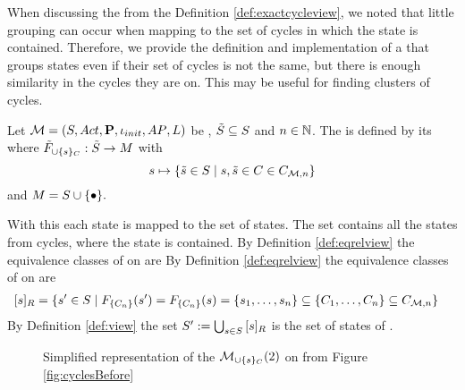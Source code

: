 \documentclass[preview]{standalone}
\begin{document}
When discussing the \viewN \viewexactcycle from the Definition \ref{def:exactcycleview}, we noted that little grouping can occur when mapping to the set of cycles in which the state is contained. Therefore, we provide the definition and implementation of a \viewN that groups states even if their set of cycles is not the same, but there is enough similarity in the cycles they are on. This may be useful for finding clusters of cycles.

\begin{definition}
	Let ${{{\mathcal{M}}}} = {{({S}, {Act}, {\textbf{P}}, {\iota_{init}}, {AP}, {L})}}$ be \achgphN, ${\tilde{{S}}} \subseteq {S}$ and $n \in {\mathbb{N}}$. The \viewN \viewcycleset is defined by its \grpfctN \gfctcycleset where $\gfctsubcycleset : \smstates \to \imggrp$ with
	\[
	\state \mapsto \{\smstate \in \states \mid \state, \smstate \in \cycle \in \cycleset\}
	\]
	and $\imggrp = \states \cup \remset.$
\end{definition}
With this \viewN each state \state is mapped to the set of states. The set contains all the states from cycles, where the state \state is contained. By Definition \ref{def:eqrelview} the equivalence classes of \eqrelview on \states are By Definition \ref{def:eqrelview} the equivalence classes of \eqrelview on \states are
\begin{align*}
	\eqclassv &= \{\state' \in \states \mid \gfctexactcycle(\state') = \gfctexactcycle(\state) = \{\state_1, \dots, \state_n\} \subseteq \{\cycle_1, \dots, \cycle_n\} \subseteq \cycleset\}
\end{align*}
\noindent By Definition \ref{def:view} the set ${S}' := \bigcup_{{s} \in {S}} {{[{s}]_{{R}}}}$ is the set of states of \viewexactcycle.
\begin{figure}[!htb]
	\centering
	
	\caption{Simplified representation of the \viewN $\viewcycleset(2)$ on \mdp from Figure \ref{fig:cyclesBefore}} 
	\label{fig:cycleAfterSet0} 
\end{figure}
\end{document}
